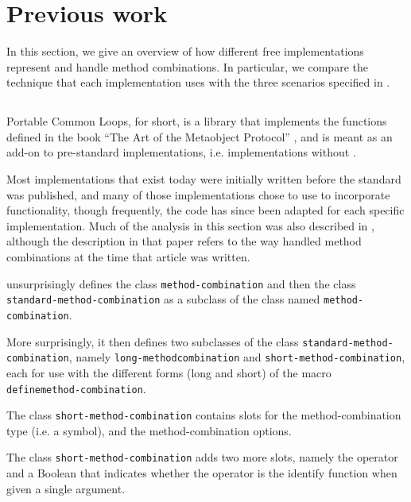 \section{Previous work}

In this section, we give an overview of how different free
\commonlisp{} implementations represent and handle method
combinations.  In particular, we compare the technique that each
implementation uses with the three scenarios specified in
.

\subsection{\pcl{}}
\label{sec-pcl}

Portable Common Loops, \pcl{} for short, is a library that implements
the functions defined in the book ``The Art of the Metaobject
Protocol'' \cite{Kiczales:1991:AMP:574212}, and is meant as an add-on
to pre-standard \commonlisp{} implementations, i.e. implementations
without \clos{}.

Most \commonlisp{} implementations that exist today were initially
written before the standard was published, and many of those
implementations chose to use \pcl{} to incorporate \clos{}
functionality, though frequently, the code has since been adapted for
each specific implementation.  Much of the analysis in this section
was also described in \cite{verna.18.els}, although the description in
that paper refers to the way \sbcl{} handled method combinations at
the time that article was written.

\pcl{} unsurprisingly defines the class \texttt{method\--combination}
and then the class \texttt{standard\--method\--combination} as a
subclass of the class named \texttt{method\--combination}.

More surprisingly, it then defines two subclasses of the class
\texttt{standard\--method\--combination}, namely
\texttt{long\--method\-combination} and
\texttt{short\--method\--combination}, each for use with the different
forms (long and short) of the macro
\texttt{define\-method\--combination}.

The class \texttt{short-method-combination} contains slots for the
method-combination type (i.e. a symbol), and the method-combination
options.

The class \texttt{short-method-combination} adds two more slots,
namely the operator and a Boolean that indicates whether the operator
is the identify function when given a single argument.

